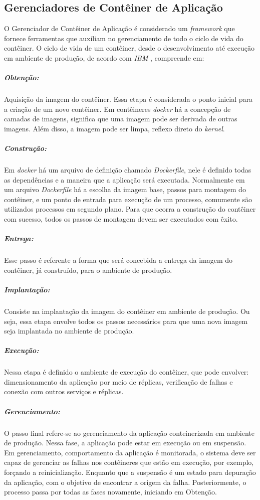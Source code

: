 \subsection{Gerenciadores de Contêiner de Aplicação}
O Gerenciador de Contêiner de Aplicação é considerado um \textit{framework} que fornece ferramentas que auxiliam no gerenciamento de todo o ciclo de vida do contêiner. O ciclo de vida de um contêiner, desde o desenvolvimento até execução em ambiente de produção, de acordo com \textit{IBM} \cite{ibm-ciclo}, compreende em:

\subparagraph{Obtenção:}
Aquisição da imagem do contêiner. Essa etapa é considerada o ponto inicial para a criação de um novo contêiner. Em contêineres \textit{docker} há a concepção de camadas de imagens, significa que uma imagem pode ser derivada de outras imagens. Além disso, a imagem pode ser limpa, reflexo direto do \textit{kernel}.
\subparagraph{Construção:}
Em \textit{docker} há um arquivo de definição chamado \textit{Dockerfile}, nele é definido todas as dependências e a maneira que a aplicação será executada. Normalmente em um arquivo \textit{Dockerfile} há a escolha da imagem base, passos para montagem do contêiner, e um ponto de entrada para execução de um processo, comumente são utilizados processos em segundo plano. Para que ocorra a construção do contêiner com sucesso, todos os passos de montagem devem ser executados com êxito.
\subparagraph{Entrega:}
Esse passo é referente a forma que será concebida a entrega da imagem do contêiner, já construído, para o ambiente de produção.
\subparagraph{Implantação:}
Consiste na implantação da imagem do contêiner em ambiente de  produção. Ou seja, essa etapa envolve todos os passos necessários para que uma nova imagem seja implantada no ambiente de produção.
\subparagraph{Execução:}
Nessa etapa é definido o ambiente de execução do contêiner, que pode envolver: dimensionamento da aplicação por meio de réplicas, verificação de falhas e conexão com outros serviços e réplicas.

\subparagraph{Gerenciamento:}
O passo final refere-se ao gerenciamento da aplicação conteinerizada em ambiente de produção. Nessa fase, a aplicação pode estar em execução ou em suspensão. Em gerenciamento, comportamento da aplicação é monitorada, o sistema deve ser capaz de gerenciar as falhas nos contêineres que estão em execução, por exemplo, forçando a reinicialização. Enquanto que a suspensão é um estado para depuração da aplicação, com o objetivo de encontrar a origem da falha. Posteriormente, o processo passa por todas as fases novamente, iniciando em Obtenção.

